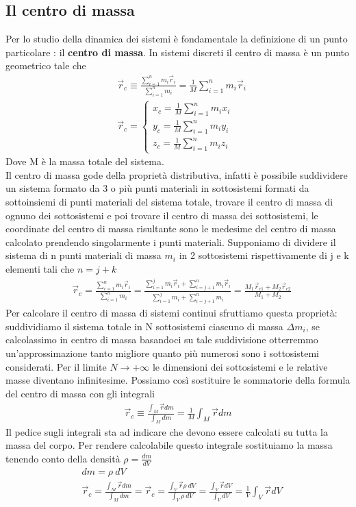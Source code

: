 \documentclass[10pt,a4paper]{article}
\begin{document}
\subsection{Il centro di massa}
Per lo studio della dinamica dei sistemi è fondamentale la definizione di un punto particolare : il \textbf{centro di massa}.
In sistemi discreti il centro di massa è un punto geometrico tale che
\begin{align*}
&\vec{r}_c \equiv \frac{\sum_{i = 1}^{n}m_i \vec{r}_i}{\sum_{i = 1}^{n}m_i} = \frac{1}{M} \sum_{i=1}^{n}m_i \vec{r}_i\\
&\vec{r}_c = 
\begin{cases}
	x_c = \frac{1}{M} \sum_{i=1}^{n}m_i x_i\\
	y_c = \frac{1}{M} \sum_{i=1}^{n}m_i y_i\\
	z_c = \frac{1}{M} \sum_{i=1}^{n}m_i z_i
\end{cases}
\end{align*}
Dove M è la massa totale del sistema.\\
Il centro di massa gode della proprietà distributiva, infatti è possibile suddividere un sistema formato da 3 o più punti materiali in sottosistemi formati da sottoinsiemi di punti materiali del sistema totale, trovare il centro di massa di ognuno dei sottosistemi e poi trovare il centro di massa dei sottosistemi, le coordinate del centro di massa risultante sono le medesime del centro di massa calcolato prendendo singolarmente i punti materiali. Supponiamo di dividere il sistema di n punti materiali di massa $m_i$ in 2 sottosistemi rispettivamente di j e k elementi tali che $n = j+k$
\begin{align}\label{eq:motocentrodimassa}
	&\vec{r}_c = \frac{\sum_{i = 1}^{n}m_i \vec{r}_i}{\sum_{i = 1}^{n}m_i} = \frac{\sum_{i = 1}^{j}m_i \vec{r}_i+\sum_{i = j+1}^{n}m_i\vec{r}_i}{\sum_{i = 1}^{j}m_i+\sum_{i = j+1}^{n}m_i} =\frac{M_1 \vec{r}_{c1}+M_2 \vec{r}_{c2}}{M_1+M_2}
\end{align}
Per calcolare il centro di massa di sistemi continui sfruttiamo questa proprietà: suddividiamo il sistema totale in N sottosistemi ciascuno di massa $\Delta m_i$, se calcolassimo in centro di massa basandoci su tale suddivisione otterremmo un'approssimazione tanto migliore quanto più numerosi sono i sottosistemi considerati. Per il limite $N\rightarrow +\infty $ le dimensioni dei sottosistemi e le relative masse diventano infinitesime. Possiamo così sostituire le sommatorie della formula del centro di massa con gli integrali
\begin{align*}
	\vec{r}_{c} \equiv \frac{\int_M \vec{r}dm}{\int_M dm}= \frac{1}{M}\int_M\vec{r}dm
\end{align*}
Il pedice sugli integrali sta ad indicare che devono essere calcolati su tutta la massa del corpo. Per rendere calcolabile questo integrale sostituiamo la massa tenendo conto della densità $\rho = \frac{dm}{dV}$
\begin{align*}
&dm = \rho\ dV\\
&\vec{r}_{c} = \frac{\int_M \vec{r}dm}{\int_M dm}=\vec{r}_{c} = \frac{\int_V \vec{r}\rho\ dV}{\int_V \rho\ dV}=\frac{\int_V \vec{r} dV}{\int_V dV}= \frac{1}{V}\int_V \vec{r} dV
\end{align*}
\end{document}
